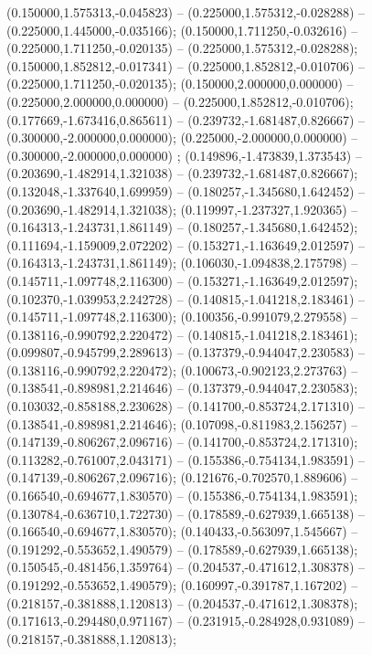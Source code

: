  (0.150000,1.575313,-0.045823) -- (0.225000,1.575312,-0.028288) -- (0.225000,1.445000,-0.035166);
 (0.150000,1.711250,-0.032616) -- (0.225000,1.711250,-0.020135) -- (0.225000,1.575312,-0.028288);
 (0.150000,1.852812,-0.017341) -- (0.225000,1.852812,-0.010706) -- (0.225000,1.711250,-0.020135);
 (0.150000,2.000000,0.000000) -- (0.225000,2.000000,0.000000) -- (0.225000,1.852812,-0.010706);
 (0.177669,-1.673416,0.865611) -- (0.239732,-1.681487,0.826667) -- (0.300000,-2.000000,0.000000);
 (0.225000,-2.000000,0.000000) -- (0.300000,-2.000000,0.000000) ;
 (0.149896,-1.473839,1.373543) -- (0.203690,-1.482914,1.321038) -- (0.239732,-1.681487,0.826667);
 (0.132048,-1.337640,1.699959) -- (0.180257,-1.345680,1.642452) -- (0.203690,-1.482914,1.321038);
 (0.119997,-1.237327,1.920365) -- (0.164313,-1.243731,1.861149) -- (0.180257,-1.345680,1.642452);
 (0.111694,-1.159009,2.072202) -- (0.153271,-1.163649,2.012597) -- (0.164313,-1.243731,1.861149);
 (0.106030,-1.094838,2.175798) -- (0.145711,-1.097748,2.116300) -- (0.153271,-1.163649,2.012597);
 (0.102370,-1.039953,2.242728) -- (0.140815,-1.041218,2.183461) -- (0.145711,-1.097748,2.116300);
 (0.100356,-0.991079,2.279558) -- (0.138116,-0.990792,2.220472) -- (0.140815,-1.041218,2.183461);
 (0.099807,-0.945799,2.289613) -- (0.137379,-0.944047,2.230583) -- (0.138116,-0.990792,2.220472);
 (0.100673,-0.902123,2.273763) -- (0.138541,-0.898981,2.214646) -- (0.137379,-0.944047,2.230583);
 (0.103032,-0.858188,2.230628) -- (0.141700,-0.853724,2.171310) -- (0.138541,-0.898981,2.214646);
 (0.107098,-0.811983,2.156257) -- (0.147139,-0.806267,2.096716) -- (0.141700,-0.853724,2.171310);
 (0.113282,-0.761007,2.043171) -- (0.155386,-0.754134,1.983591) -- (0.147139,-0.806267,2.096716);
 (0.121676,-0.702570,1.889606) -- (0.166540,-0.694677,1.830570) -- (0.155386,-0.754134,1.983591);
 (0.130784,-0.636710,1.722730) -- (0.178589,-0.627939,1.665138) -- (0.166540,-0.694677,1.830570);
 (0.140433,-0.563097,1.545667) -- (0.191292,-0.553652,1.490579) -- (0.178589,-0.627939,1.665138);
 (0.150545,-0.481456,1.359764) -- (0.204537,-0.471612,1.308378) -- (0.191292,-0.553652,1.490579);
 (0.160997,-0.391787,1.167202) -- (0.218157,-0.381888,1.120813) -- (0.204537,-0.471612,1.308378);
 (0.171613,-0.294480,0.971167) -- (0.231915,-0.284928,0.931089) -- (0.218157,-0.381888,1.120813);
